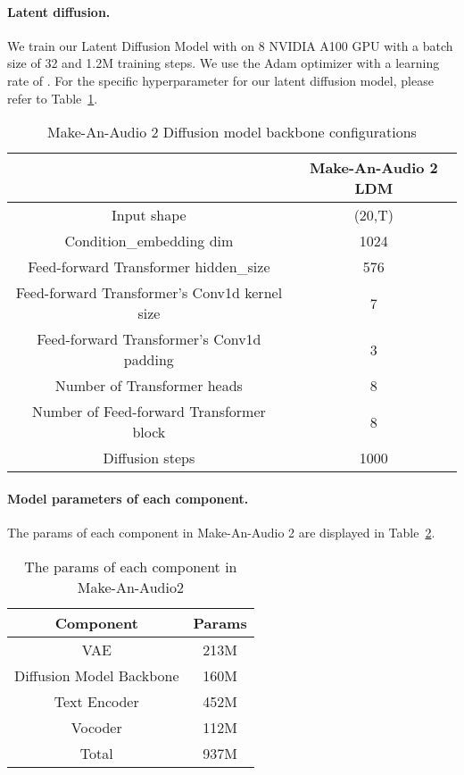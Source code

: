 \documentclass{article}
\begin{document}
\paragraph{Latent diffusion.}
We train our Latent Diffusion Model with on 8 NVIDIA A100 GPU with a batch size of 32 and 1.2M training steps. We use the Adam optimizer with a learning rate of . For the specific hyperparameter for our latent diffusion model, please refer to Table~\ref{tab:LDM_config}.

\begin{table}[htbp]
  \centering
    \begin{tabular}{c|c}
    \toprule
           & Make-An-Audio 2 LDM \\
    \midrule 
    Input shape & (20,T) \\
    Condition\_embedding dim & 1024 \\
    Feed-forward Transformer hidden\_size & 576 \\
    Feed-forward Transformer's Conv1d kernel size & 7 \\
    Feed-forward Transformer's Conv1d padding & 3 \\
    Number of Transformer heads & 8 \\
    Number of Feed-forward Transformer block & 8 \\
    Diffusion steps & 1000 \\
    \bottomrule
    \end{tabular}\vspace{5pt}
  \caption{Make-An-Audio 2 Diffusion model backbone configurations}
  \label{tab:LDM_config}\end{table}

\paragraph{Model parameters of each component.}
The params of each component in Make-An-Audio 2 are displayed in Table~\ref{tab:component_param}.

\begin{table}[htbp]
  \centering
    \begin{tabular}{cc}
    \toprule
    Component & Params \\
    \midrule 
    VAE    & 213M \\
    Diffusion Model Backbone & 160M \\
    Text Encoder & 452M \\
    Vocoder & 112M \\
    \midrule 
    Total  & 937M \\
    \bottomrule
    \end{tabular}\vspace{5pt}
  \caption{The params of each component in Make-An-Audio2}
  \label{tab:component_param}\end{table}
\end{document}
